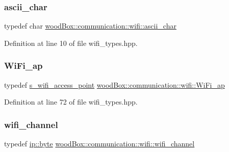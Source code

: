 \subsubsection{\texorpdfstring{ascii\+\_\+char}{ascii\_char}}
{\footnotesize\ttfamily typedef char \mbox{\hyperlink{namespacewood_box_1_1communication_1_1wifi_a29995934e86031637bb2e0d8192cc467}{wood\+Box\+::communication\+::wifi\+::ascii\+\_\+char}}}



Definition at line 10 of file wifi\+\_\+types.\+hpp.

\mbox{\label{namespacewood_box_1_1communication_1_1wifi_ab28c5c66d6e5d8b41938d2494a633134}} 
\subsubsection{\texorpdfstring{Wi\+Fi\+\_\+ap}{WiFi\_ap}}
{\footnotesize\ttfamily typedef \mbox{\hyperlink{structwood_box_1_1communication_1_1wifi_1_1s__wifi__access__point}{s\+\_\+wifi\+\_\+access\+\_\+point}} \mbox{\hyperlink{namespacewood_box_1_1communication_1_1wifi_ab28c5c66d6e5d8b41938d2494a633134}{wood\+Box\+::communication\+::wifi\+::\+Wi\+Fi\+\_\+ap}}}



Definition at line 72 of file wifi\+\_\+types.\+hpp.

\mbox{\label{namespacewood_box_1_1communication_1_1wifi_a9e6c3404835d9868a9bf5eb76f50fec2}} 
\subsubsection{\texorpdfstring{wifi\+\_\+channel}{wifi\_channel}}
{\footnotesize\ttfamily typedef \mbox{\hyperlink{namespacewood_box_1_1communication_1_1ip_af1b00b9755ebc1bbeb6b5be2068bb421}{ip\+::byte}} \mbox{\hyperlink{namespacewood_box_1_1communication_1_1wifi_a9e6c3404835d9868a9bf5eb76f50fec2}{wood\+Box\+::communication\+::wifi\+::wifi\+\_\+channel}}}



